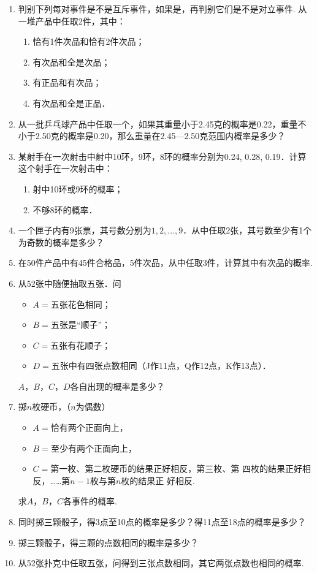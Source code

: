 \begin{ex}
\begin{enumerate}
    \item 判别下列每对事件是不是互斥事件，如果是，再判别它们是不是对立事件.
从一堆产品中任取2件，其中：
\begin{enumerate}[(1)]
\item 恰有1件次品和恰有2件次品；
\item 有次品和全是次品；
\item 有正品和有次品；
\item 有次品和全是正品．
\end{enumerate}

\item 从一批乒乓球产品中任取一个，如果其重量小于2.45克的概率是0.22，重量不小于2.50克的概率是0.20，那么重量在2.45—2.50克范围内概率是多少？
\item 某射手在一次射击中射中10环，9环，8环的概率分别为0.24, 0.28, 0.19．计算这个射手在一次射击中：
\begin{enumerate}[(1)]
    \item 射中10环或9环的概率；
    \item 不够8环的概率．
\end{enumerate}

\item 一个匣子内有9张票，其号数分别为$1,2,\ldots,9$．从中任取2张，其号数至少有1个为奇数的概率是多少？
\item 在50件产品中有45件合格品，5件次品，从中任取3件，计算其中有次品的概率.
\item 从52张中随便抽取五张．问
\begin{itemize}
\item $A=$五张花色相同；
\item $B=$五张是“顺子”；
\item $C=$五张有花顺子；
\item $D=$五张中有四张点数相同（J作11点，Q作12点，K作13点）．
\end{itemize}
$A$，$B$，$C$，$D$各自出现的概率是多少？
\item 掷$n$枚硬币，（$n$为偶数）
\begin{itemize}
\item $A=$恰有两个正面向上，
\item $B=$至少有两个正面向上，
\item $C=$第一枚、第二枚硬币的结果正好相反，第三枚、第
四枚的结果正好相反，……第$n-1$枚与第$n$枚的结果正
好相反.
\end{itemize}
求$A$，$B$，$C$各事件的概率.
\item 同时掷三颗骰子，得3点至10点的概率是多少？得11点至18点的概率是多少？
\item 掷三颗骰子，得三颗的点数相同的概率是多少？
\item 从52张扑克中任取五张，问得到三张点数相同，其它两张点数也相同的概率.
\end{enumerate}
\end{ex}

